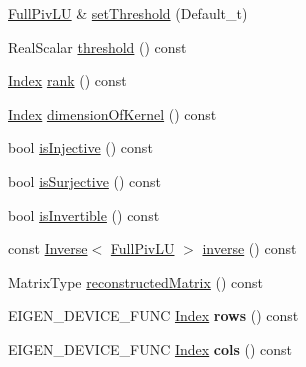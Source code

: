 \begin{DoxyCompactItemize}
\item 
\mbox{\hyperlink{class_eigen_1_1_full_piv_l_u}{Full\+Piv\+LU}} \& \mbox{\hyperlink{class_eigen_1_1_full_piv_l_u_a1b5e30add3dfb6625da1213d68418f44}{set\+Threshold}} (Default\+\_\+t)
\item 
Real\+Scalar \mbox{\hyperlink{class_eigen_1_1_full_piv_l_u_ad77539203694f2d85ff7d11616e5a0a5}{threshold}} () const
\item 
\mbox{\hyperlink{struct_eigen_1_1_eigen_base_a554f30542cc2316add4b1ea0a492ff02}{Index}} \mbox{\hyperlink{class_eigen_1_1_full_piv_l_u_a67a870aa69e699e058d04802ba0bdad9}{rank}} () const
\item 
\mbox{\hyperlink{struct_eigen_1_1_eigen_base_a554f30542cc2316add4b1ea0a492ff02}{Index}} \mbox{\hyperlink{class_eigen_1_1_full_piv_l_u_a64e191225834e91161ea53ad4b78167b}{dimension\+Of\+Kernel}} () const
\item 
bool \mbox{\hyperlink{class_eigen_1_1_full_piv_l_u_ab13992c852aa593461d9b81790b56667}{is\+Injective}} () const
\item 
bool \mbox{\hyperlink{class_eigen_1_1_full_piv_l_u_a1f6222875fc3a181ee1544b9b36dfda5}{is\+Surjective}} () const
\item 
bool \mbox{\hyperlink{class_eigen_1_1_full_piv_l_u_afdf2579c93473650f2ef2a47a376c4a0}{is\+Invertible}} () const
\item 
const \mbox{\hyperlink{class_eigen_1_1_inverse}{Inverse}}$<$ \mbox{\hyperlink{class_eigen_1_1_full_piv_l_u}{Full\+Piv\+LU}} $>$ \mbox{\hyperlink{class_eigen_1_1_full_piv_l_u_ae6f4bb55f859f6353f99cf15ecff4b25}{inverse}} () const
\item 
Matrix\+Type \mbox{\hyperlink{class_eigen_1_1_full_piv_l_u_a191a4f598b0c192a83ab48984e87ee51}{reconstructed\+Matrix}} () const
\item 
\mbox{\label{class_eigen_1_1_full_piv_l_u_a3e6a55cd997c2a16fa6cd81be321c916}} 
E\+I\+G\+E\+N\+\_\+\+D\+E\+V\+I\+C\+E\+\_\+\+F\+U\+NC \mbox{\hyperlink{struct_eigen_1_1_eigen_base_a554f30542cc2316add4b1ea0a492ff02}{Index}} {\bfseries rows} () const
\item 
\mbox{\label{class_eigen_1_1_full_piv_l_u_ab775ce41ec3e916ad86868f413c20e85}} 
E\+I\+G\+E\+N\+\_\+\+D\+E\+V\+I\+C\+E\+\_\+\+F\+U\+NC \mbox{\hyperlink{struct_eigen_1_1_eigen_base_a554f30542cc2316add4b1ea0a492ff02}{Index}} {\bfseries cols} () const
\item 
\mbox{\label{class_eigen_1_1_full_piv_l_u_aae839fc52d4c930e6d18c973d9f708cd}} 

\end{DoxyCompactItemize}
